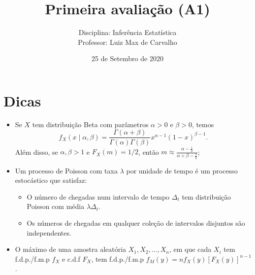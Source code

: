 \documentclass[a4paper,10pt, notitlepage]{report}
\title{Primeira avaliação (A1)}
\author{Disciplina: Inferência Estatística \\ Professor: Luiz Max de Carvalho}
\date{25 de Setembro de 2020}
\newcommand{\rs}{X_1, X_2, \ldots, X_n} %
\begin{document}
\maketitle


\begin{center}
\end{center}

\section*{Dicas}
\begin{itemize}
 \item Se $X$ tem distribuição Beta com parâmetros $\alpha>0$ e $\beta>0$, temos
 \[f_X(x \mid \alpha, \beta) = \frac{\Gamma(\alpha + \beta)}{\Gamma(\alpha)\Gamma(\beta)} x^{\alpha-1} (1-x)^{\beta-1}.\]
 Além disso, se $\alpha, \beta > 1$ e $F_X(m) = 1/2$, então $m \approx \frac{\alpha-\frac{1}{3}}{\alpha + \beta - \frac{2}{3}}$;
 \item Um processo de Poisson com taxa $\lambda$ por unidade de tempo é um processo estocástico que satisfaz:
 \begin{itemize}
  \item O número de chegadas num intervalo de tempo $\Delta_t$ tem distribuição Poisson com média $\lambda\Delta_t$.
  \item Os números de chegadas em qualquer coleção de intervalos disjuntos são independentes.
 \end{itemize}
 \item O máximo de uma amostra aleatória $\rs$, em que cada $X_i$ tem f.d.p./f.m.p $f_X$ e c.d.f $F_X$, tem f.d.p./f.m.p $f_M(y) = nf_X(y) \left[F_X(y)\right]^{n-1}$.
 \end{itemize}
 
\end{document}
